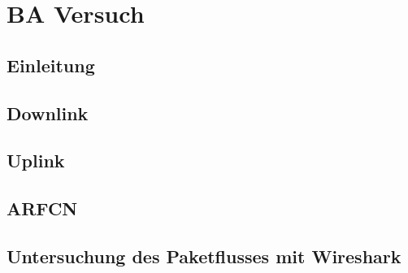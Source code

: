 
\chapter{BA Versuch}
\section{Einleitung}

\section{Downlink}

\section{Uplink}

\section{ARFCN}


\section{Untersuchung des Paketflusses mit Wireshark}

